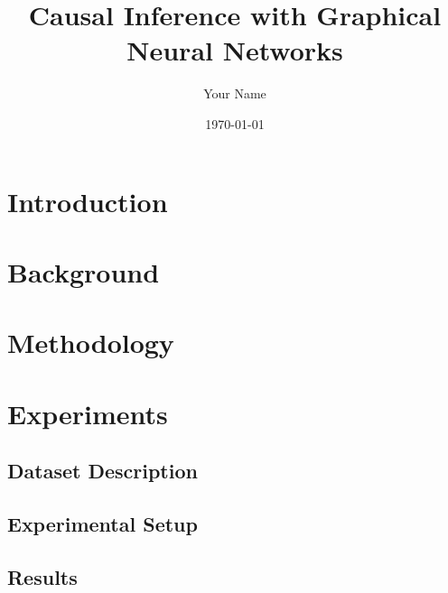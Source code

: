 \documentclass{article}
\begin{document}
\title{Causal Inference with Graphical Neural Networks}
\author{Your Name}
\date{\today}
\maketitle

\section{Introduction}



\section{Background}


\section{Methodology}


\section{Experiments}


\subsection{Dataset Description}


\subsection{Experimental Setup}


\subsection{Results}
\end{document}
